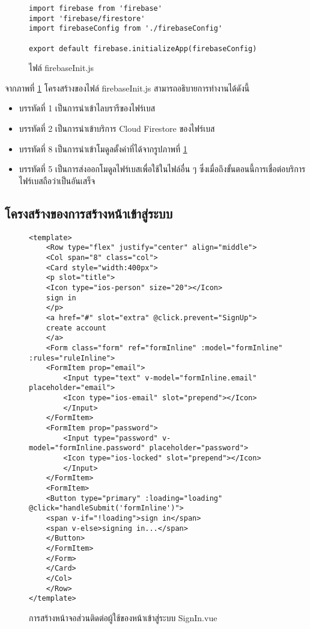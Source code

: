 	\begin{figure}[H]
		{\begin{lstlisting}
import firebase from 'firebase'
import 'firebase/firestore'
import firebaseConfig from './firebaseConfig'

export default firebase.initializeApp(firebaseConfig)
			\end{lstlisting}}
		\caption{ไฟล์ firebaseInit.js}
		\label{Fig:firebaseConfig}
	\end{figure}
	จากภาพที่ \ref{Fig:firebaseConfig} โครงสร้างของไฟล์ firebaseInit.js สามารถอธิบายการทำงานได้ดังนี้
	\begin{itemize}[label={--}]
		\item บรรทัดที่  1	     เป็นการนำเข้าไลบรารีของไฟร์เบส
		\item บรรทัดที่  2 	    เป็นการนำเข้าบริการ Cloud Firestore ของไฟร์เบส 
		\item บรรทัดที่  8       เป็นการนำเข้าโมดูลตั้งค่าที่ได้จากรูปภาพที่ \ref{Fig:firebaseConfig}
		\item บรรทัดที่  5 เป็นการส่งออกโมดูลไฟร์เบสเพื่อใช้ในไฟล์อื่น ๆ ซึ่งเมื่อถึงขั้นตอนนี้การเชื่อต่อบริการไฟร์เบสถือว่าเป็นอันเสร็จ
	\end{itemize}
	
	\subsection{โครงสร้างของการสร้างหน้าเข้าสู่ระบบ}
	\begin{figure}[H]
	{\begin{lstlisting}
<template>
	<Row type="flex" justify="center" align="middle">
	<Col span="8" class="col">
	<Card style="width:400px">
	<p slot="title">
	<Icon type="ios-person" size="20"></Icon>
	sign in
	</p>
	<a href="#" slot="extra" @click.prevent="SignUp">
	create account
	</a>
	<Form class="form" ref="formInline" :model="formInline" :rules="ruleInline">
	<FormItem prop="email">
		<Input type="text" v-model="formInline.email" placeholder="email">
		<Icon type="ios-email" slot="prepend"></Icon>
		</Input>
	</FormItem>
	<FormItem prop="password">
		<Input type="password" v-model="formInline.password" placeholder="password">
		<Icon type="ios-locked" slot="prepend"></Icon>
		</Input>
	</FormItem>
	<FormItem>
	<Button type="primary" :loading="loading" @click="handleSubmit('formInline')">
	<span v-if="!loading">sign in</span>
	<span v-else>signing in...</span>
	</Button>
	</FormItem>
	</Form>         
	</Card>
	</Col>
	</Row>
</template>
		\end{lstlisting}}
		\caption{การสร้างหน้าจอส่วนติดต่อผู้ใช้ของหน้าเข้าสู่ระบบ SignIn.vue}
		\label{Fig:SignIn}
	\end{figure}
	
